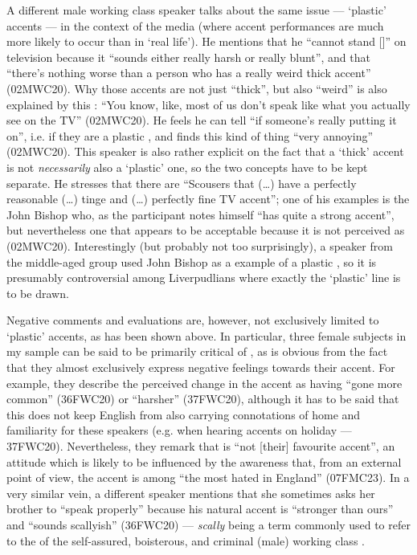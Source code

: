 A different male working class speaker talks about the same issue --- `plastic'  accents --- in the context of the media (where  accent performances are much more likely to occur than in `real life').
He mentions that he ``cannot stand []'' on television because it ``sounds either really harsh or really blunt'', and that ``there's nothing worse than a person who has a really weird thick  accent'' (02MWC20).
Why those accents are not just ``thick'', but also ``weird'' is also explained by this : ``You know, like, most of us don't speak like what you actually see on the TV'' (02MWC20).
He feels he can tell ``if someone's really putting it on'', i.e. if they are a plastic , and finds this kind of thing ``very annoying'' (02MWC20).
This speaker is also rather explicit on the fact that a `thick' accent is not \emph{necessarily} also a `plastic' one, so the two concepts have to be kept separate.
He stresses that there are ``Scousers that (\ldots) have a perfectly reasonable (\ldots) tinge and (\ldots) perfectly fine TV accent''; one of his examples is the  John Bishop who, as the participant notes himself ``has quite a strong  accent'', but nevertheless one that appears to be acceptable because it is not perceived as  (02MWC20).
Interestingly (but probably not too surprisingly), a speaker from the middle-aged group used John Bishop as a  example of a plastic , so it is presumably controversial among Liverpudlians where exactly the `plastic' line is to be drawn.

Negative comments and evaluations are, however, not exclusively limited to `plastic' accents, as has been shown above.
In particular, three female subjects in my sample can be said to be primarily critical of , as is obvious from the fact that they almost exclusively express negative feelings towards their accent.
For example, they describe the perceived change in the accent as  having ``gone more common'' (36FWC20) or ``harsher'' (37FWC20), although it has to be said that this does not keep  English from also carrying connotations of home and familiarity for these speakers (e.g. when hearing  accents on holiday --- 37FWC20).
Nevertheless, they remark that  is ``not [their] favourite accent'', an attitude which is likely to be influenced by the awareness that, from an external point of view, the  accent is among ``the most hated in England'' (07FMC23).
In a very similar vein, a different speaker mentions that she sometimes asks her brother to ``speak properly'' because his natural accent is ``stronger than ours'' and ``sounds scallyish'' (36FWC20) --- \emph{scally} being a term commonly used to refer to the  of the self-assured, boisterous, and criminal (male) working class .

